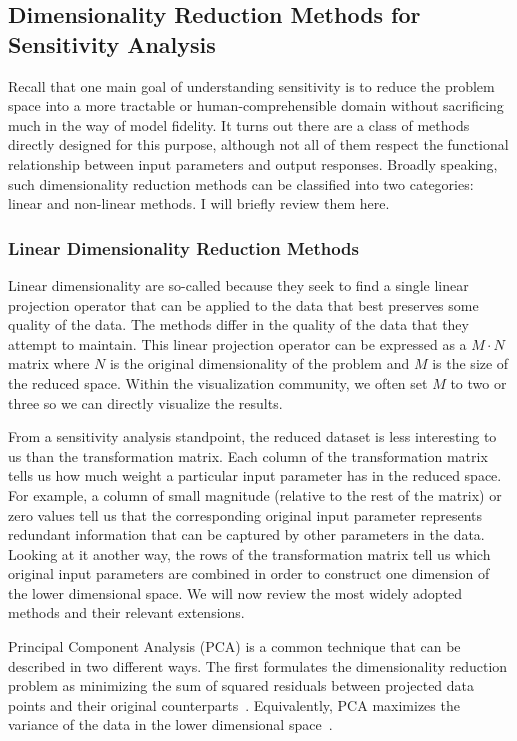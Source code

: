 \subsection{Dimensionality Reduction Methods for Sensitivity Analysis}

Recall that one main goal of understanding sensitivity is to reduce the problem space into a more tractable or human-comprehensible domain without sacrificing much in the way of model fidelity.
%
It turns out there are a class of methods directly designed for this purpose, although not all of them respect the functional relationship between input parameters and output responses.
%
Broadly speaking, such dimensionality reduction methods can be classified into two categories: linear and non-linear methods.
%
I will briefly review them here.

\subsubsection{Linear Dimensionality Reduction Methods}

Linear dimensionality are so-called because they seek to find a single linear projection operator that can be applied to the data that best preserves some quality of the data.
%
The methods differ in the quality of the data that they attempt to maintain.
%
This linear projection operator can be expressed as a $M \cdot N$ matrix where $N$ is the original dimensionality of the problem and $M$ is the size of the reduced space.
%
Within the visualization community, we often set $M$ to two or three so we can directly visualize the results.

From a sensitivity analysis standpoint, the reduced dataset is less interesting to us than the transformation matrix.
%
Each column of the transformation matrix tells us how much weight a particular input parameter has in the reduced space.
%
For example, a column of small magnitude (relative to the rest of the matrix) or zero values tell us that the corresponding original input parameter represents redundant information that can be captured by other parameters in the data.
%
Looking at it another way, the rows of the transformation matrix tell us which original input parameters are combined in order to construct one dimension of the lower dimensional space.
%
We will now review the most widely adopted methods and their relevant extensions.

Principal Component Analysis (PCA) is a common technique that can be described in two different ways.
%
The first formulates the dimensionality reduction problem as minimizing the sum of squared residuals between projected data points and their original counterparts~\cite{Pearson1901}.
%
Equivalently, PCA maximizes the variance of the data in the lower dimensional space~\cite{Hotelling1933}.

